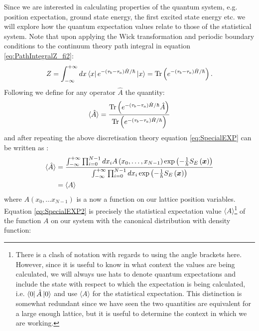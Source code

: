 \documentclass[12pt]{article}
\begin{document}
        Since we are interested in calculating properties of the quantum system, e.g. position expectation, ground state energy, the first excited state energy etc. we will explore how the quantum expectation values relate to those of the statistical system. Note that upon applying the Wick transformation and periodic boundary conditions to the continuum theory path integral in equation \ref{eq:PathIntegralZ_fi2}:
        \begin{equation}
            Z = \int_{-\infty}^{+\infty} dx \bra{x}e^{-\left(\tau_b-\tau_a\right)\hat{H}/\hbar}\ket{x} = \text{Tr}\left(e^{-\left(\tau_b-\tau_a\right)\hat{H}/\hbar}\right).
        \end{equation}
        Following \cite{creutz_freedman_1981} we define for any operator $\hat{A}$ the quantity:
        \begin{equation}
            \label{eq:SpecialEXP}
            \braket{\hat{A}} = \frac{\text{Tr}\left(e^{-\left(\tau_b-\tau_a\right)\hat{H}/\hbar}\hat{A}\right)}{\text{Tr}\left(e^{-\left(\tau_b-\tau_a\right)\hat{H}/\hbar}\right)}
        \end{equation}
        and after repeating the above discretisation theory equation \ref{eq:SpecialEXP} can be written as \cite{creutz_freedman_1981}:
        \begin{align}
            \label{eq:SpecialEXP2}
            \braket{\hat{A}} & = \frac{\int^{+\infty}_{-\infty}\prod_{i=0}^{N-1}dx_i A\left(x_0,\dots,x_{N-1}\right)\exp{\left(-\frac{1}{\hbar}S_{E}\left(\bm{x}\right)\right)}}{\int^{+\infty}_{-\infty}\prod_{i=0}^{N-1}dx_i \exp{\left(-\frac{1}{\hbar}S_{E}\left(\bm{x}\right)\right)}}\\
            & = \langle A \rangle
        \end{align}
        where $A\left(x_0,\dots x_{N-1}\right)$ is a now a function on our lattice position variables. Equation \ref{eq:SpecialEXP2} is precisely the statistical expectation value $\langle A \rangle$\footnote{There is a clash of notation with regards to using the angle brackets here. However, since it is useful to know in what context the values are being calculated, we will always use hats to denote quantum expectations and include the state with respect to which the expectation is being calculated, i.e. $\bra{0}\hat{A}\ket{0}$ and use $\langle A \rangle$ for the statistical expectation. This distinction is somewhat redundant since we have seen the two quantities are equivalent for a large enough lattice, but it is useful to determine the context in which we are working.} of the function $A$ on our system with the canonical distribution with density function:
\end{document}
